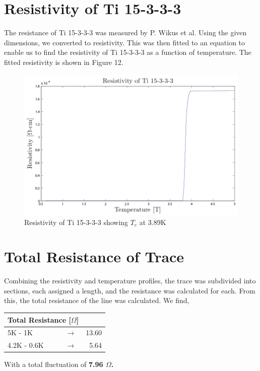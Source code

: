 \documentclass{report}
\begin{document}
\begin{appendices}
\section{Resistivity of Ti 15-3-3-3}
The resistance of Ti 15-3-3-3 was measured by P. Wikus et al. Using the given dimensions, we converted to resistivity. This was then fitted to an equation to enable us to find the resistivity of Ti 15-3-3-3 as a function of temperature. The fitted resistivity is shown in Figure 12.

\begin{figure}[h]
\centering
\includegraphics[width = .6\textwidth]{Ti_Resistivity.png}
\caption{Resistivity of Ti 15-3-3-3 showing $T_c$ at 3.89K}
\end{figure}

\section{Total Resistance of Trace}

Combining the resistivity and temperature profiles, the trace was subdivided into sections, each assigned a length, and the resistance was calculated for each. From this, the total resistance of the line was calculated. We find,

\begin{table}[h]
\begin{threeparttable}
\begin{tabular}{lcr}
\toprule
\multicolumn{2}{r}{Total Resistance [$\Omega$]} \\
\midrule
5K - 1K & $\rightarrow$ & 13.60 \\
4.2K - 0.6K & $\rightarrow$ & 5.64 \\
\bottomrule
\end{tabular}
\end{threeparttable}
\end{table}

\noindent With a total fluctuation of \bf{7.96 $\Omega$}.



\end{appendices}
\end{document}
